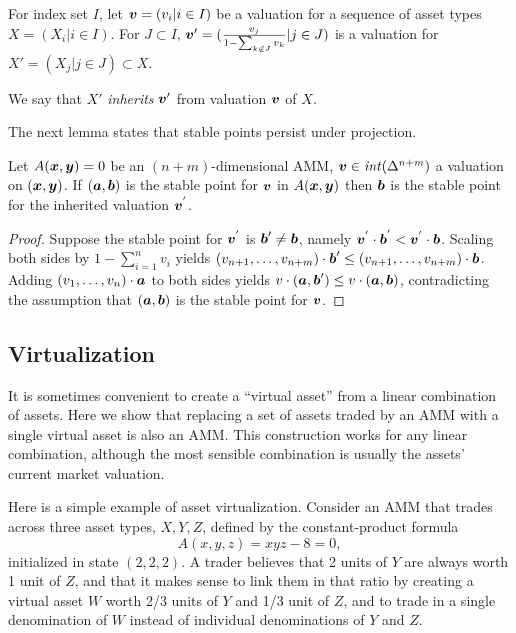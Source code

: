 \begin{lemma}
For index set $I$,
let ${\boldsymbol v} = (v_i | i \in I)$ be a valuation for
a sequence of asset types $X = (X_i | i \in I)$.
For $J \subset I$,
${\boldsymbol v}' = (\frac{v_j}{1 - \sum_{k \not \in J}v_k} | j \in J)$
is a valuation for $X' = (X_j | j \in J) \subset X$.
\end{lemma}
We say that $X'$ \emph{inherits} ${\boldsymbol v}'$ from valuation ${\boldsymbol v}$ of $X$.

The next lemma states that stable points persist under projection.
\begin{lemma}
Let $A({\boldsymbol x},{\boldsymbol y}) = 0$ be an $(n+m)$-dimensional AMM,
${\boldsymbol v} \in \mathit{int}(\Delta^{n+m})$ a valuation on $({\boldsymbol x},{\boldsymbol y})$.
If $({\boldsymbol a},{\boldsymbol b})$ is the stable point for ${\boldsymbol v}$ in $A({\boldsymbol x},{\boldsymbol y})$
then ${\boldsymbol b}$ is the stable point for the inherited valuation ${\boldsymbol v}^{'}$.
\end{lemma}
\begin{proof}
  Suppose the stable point for ${\boldsymbol v}^{'}$ is ${\boldsymbol b}' \neq {\boldsymbol b}$, namely ${\boldsymbol v}^{'} \cdot {\boldsymbol b}^{'} < {\boldsymbol v}^{'} \cdot {\boldsymbol b}$.
  Scaling both sides by $1 - \sum_{i = 1}^{n} v_i$ yields
  $(v_{n+1},\ldots,v_{n+m}) \cdot {\boldsymbol b}' \leq (v_{n+1},\ldots,v_{n+m}) \cdot {\boldsymbol b}$.
  Adding $(v_1, \ldots, v_n) \cdot {\boldsymbol a}$ to both sides yields
  $v \cdot ({\boldsymbol a},{\boldsymbol b}') \leq v \cdot ({\boldsymbol a},{\boldsymbol b})$,
  contradicting the assumption that $({\boldsymbol a},{\boldsymbol b})$ is the stable point for ${\boldsymbol v}$.
\end{proof}

\subsection{Virtualization}
It is sometimes convenient to create a ``virtual asset''
from a linear combination of assets.
Here we show that replacing a set of assets
traded by an AMM with a single virtual asset
is also an AMM.
This construction works for any linear combination,
although the most sensible combination
is usually the assets' current market valuation.

Here is a simple example of asset virtualization.
Consider an AMM that trades across three asset types,
$X,Y,Z$, defined by the constant-product formula 
\begin{equation*}
    A(x,y,z) = x y z - 8 = 0,
\end{equation*}
initialized in state $(2,2,2)$.
A trader believes that 2 units of $Y$ are always worth 1 unit of $Z$,
and that it makes sense to link them in that ratio
by creating a virtual asset $W$
worth 2/3 units of $Y$ and 1/3 unit of $Z$,
and to trade in a single denomination of $W$ instead of
individual denominations of $Y$ and $Z$.

